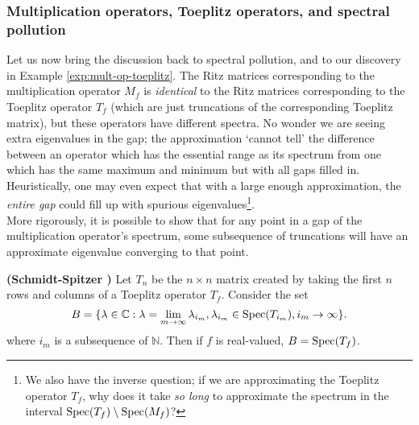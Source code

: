 \documentclass[../main.tex]{subfiles}
\begin{document}
\subsubsection{Multiplication operators, Toeplitz operators, and spectral pollution}
Let us now bring the discussion back to spectral pollution, and to our discovery in Example \ref{exp:mult-op-toeplitz}. The Ritz matrices corresponding to the
multiplication operator $M_f$ is \emph{identical} to the Ritz matrices corresponding to the Toeplitz operator $T_f$ (which are just truncations of the 
corresponding Toeplitz matrix), but these operators have different spectra. No wonder we are seeing extra eigenvalues in the gap; the approximation
`cannot tell' the difference between an operator which has the essential range as its spectrum from one which has the same maximum and minimum but with
all gaps filled in. Heuristically, one may even expect that with a large enough approximation, the \emph{entire gap} could fill up with spurious
eigenvalues\footnote{We also have the inverse question; if we are approximating the Toeplitz operator $T_f$, why does it take \emph{so long} to 
approximate the spectrum in the interval $\mathrm{Spec}(T_f) \setminus \mathrm{Spec}(M_f)$?}.\\

More rigorously, it is possible to show that for any point in a gap of the multiplication operator's spectrum, some subsequence of truncations will have 
an approximate eigenvalue converging to that point. 

\begin{theorem}{\textbf{(Schmidt-Spitzer \parencite{schmidt1960toeplitz})}}
Let $T_n$ be the $n \times n$ matrix created by taking the first $n$ rows and columns of a Toeplitz operator $T_f$. Consider the set
$$B = \{\lambda \in \mathbb{C} : \lambda = \lim_{m \rightarrow \infty} \lambda_{i_m}, \lambda_{i_m} \in \mathrm{Spec}(T_{i_m}), i_m \rightarrow \infty \}.$$
where $i_m$ is a subsequence of $\mathbb{N}$. Then if $f$ is real-valued, $B = \mathrm{Spec}(T_f)$.

\end{theorem}
\end{document}
